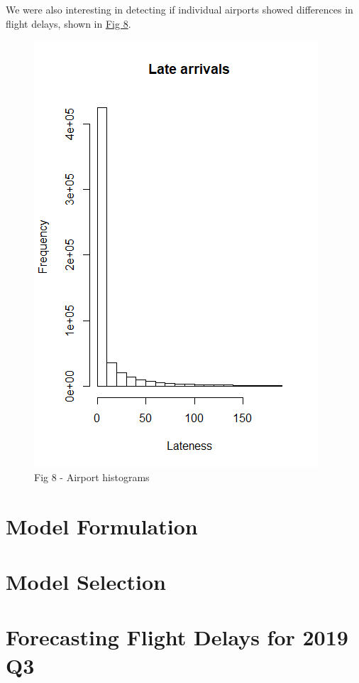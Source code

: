 \documentclass[12pt, a4paper]{book}
\newcommand\tab[1][1cm]{\hspace*{#1}}
\begin{document}
			\tab We were also interesting in detecting if individual airports showed differences in flight delays, shown in \underline{Fig 8}. 
			\begin{figure}[h]
	 		\includegraphics[width = 1 \textwidth]{../figures/LateArrivalsHistogram}
	 		\caption{Fig 8 - Airport histograms}
	 		\end{figure}
	 		
\chapter{Model Formulation}
\chapter{Model Selection}
\chapter{Forecasting Flight Delays for 2019 Q3}
\end{document}
